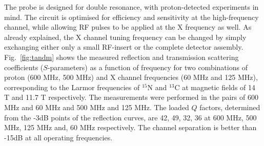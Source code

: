 \documentclass[preprint,12pt]{article}
\newcommand{\fig}[1]{Fig.~\ref{#1}}
\begin{document}
The probe is designed for double resonance, with proton-detected experiments in mind. The circuit is optimised
for efficiency and sensitivity at the high-frequency channel, while allowing RF pulses to be applied
at the X frequency as well. As already explained, the X channel tuning frequency can be changed by simply
 exchanging either only a small RF-insert or the complete detector assembly. 
 \fig{fig:tandm} shows the measured reflection and transmission scattering coefficients ($S$-parameters) as a 
 function of frequency for two combinations of 
 proton (600 MHz, 500 MHz) and X channel frequencies (60 MHz and 125 MHz), 
 corresponding to the Larmor frequencies of $^{15}$N and $^{13}$C at magnetic fields of 14 T and 11.7 T respectively. 
 The measurements were performed in the pairs of 600 MHz and 60 MHz and 500 MHz and 125 MHz. The loaded $Q$ factors,
 determined from the -3dB points of the reflection curves, are 42, 49, 32, 36 at 600 MHz, 500 MHz, 
 125 MHz and, 60 MHz respectively. The channel separation is better than -15dB at all operating frequencies.
 
\end{document}
